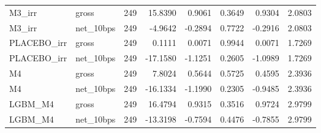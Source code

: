 \begin{tabular}{llrrrrrr}
M3\_irr & gross & 249 & 15.8390 & 0.9061 & 0.3649 & 0.9304 & 2.0803 \\
M3\_irr & net\_10bps & 249 & -4.9642 & -0.2894 & 0.7722 & -0.2916 & 2.0803 \\
PLACEBO\_irr & gross & 249 & 0.1111 & 0.0071 & 0.9944 & 0.0071 & 1.7269 \\
PLACEBO\_irr & net\_10bps & 249 & -17.1580 & -1.1251 & 0.2605 & -1.0989 & 1.7269 \\
M4 & gross & 249 & 7.8024 & 0.5644 & 0.5725 & 0.4595 & 2.3936 \\
M4 & net\_10bps & 249 & -16.1334 & -1.1990 & 0.2305 & -0.9485 & 2.3936 \\
LGBM\_M4 & gross & 249 & 16.4794 & 0.9315 & 0.3516 & 0.9724 & 2.9799 \\
LGBM\_M4 & net\_10bps & 249 & -13.3198 & -0.7594 & 0.4476 & -0.7855 & 2.9799 \\
\bottomrule
\end{tabular}
